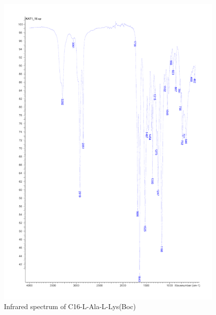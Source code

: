 \begin{figure}[ht!]
\centering
\includegraphics[scale=0.6]{IR/KAT1_18.pdf}
\caption{Infrared spectrum of C16-L-Ala-L-Lys(Boc)}
\end{figure}

